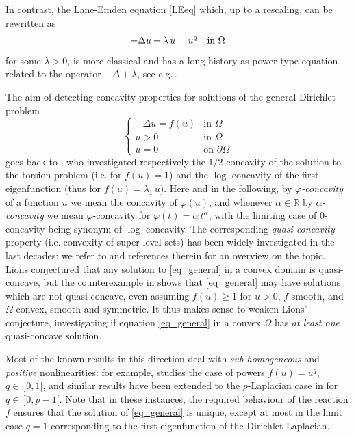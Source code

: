 \documentclass[12pt]{amsart}
\numberwithin{equation}{section}
\theoremstyle{plain}
\theoremstyle{plain}
\theoremstyle{plain}
\theoremstyle{definition}
\newcommand{\R}{{\mathbb R}}
\renewcommand{\ge}{\geqslant}
\begin{document}
In contrast, the Lane-Emden equation \eqref{LEeq} which, up to a rescaling, can be rewritten as
$$-\Delta u + \lambda\, u = u^q \quad \hbox{in $\Omega$}$$
for some $\lambda>0$, is more classical and has a long history as power type equation related to the operator $-\Delta + \lambda$, see e.g.$\,$\cite{Dan95, DGP99}. 

\medskip

The aim of detecting concavity properties for solutions of the general Dirichlet problem
\begin{equation}
\label{eq_general}
\begin{cases}
-\Delta u=f(u)& \text{in $\Omega$}\\
u>0&\text{in $\Omega$}\\
u=0&\text{on $\partial\Omega$}
\end{cases}
\end{equation}
goes back to \cite{Mak71, BrLi76}, who investigated respectively the $1/2$-concavity of the solution to the torsion problem (i.e.$\;$for $f(u)=1$) and the $\log$-concavity of the first eigenfunction (thus for $f(u)=\lambda_1\, u$). 
Here and in the following, by \emph{$\varphi$-concavity} of a function $u$ we mean the concavity of $\varphi(u)$, and whenever $\alpha\in \R$ by \emph{$\alpha$-concavity} we mean $\varphi$-concavity for $\varphi(t)=\alpha\, t^\alpha$, with the limiting case of $0$-concavity being synonym of $\log$-concavity. 
The corresponding {\em quasi-concavity} property (i.e.$\;$convexity of super-level sets) has been widely investigated in the last decades: we refer to \cite{GaSq25, AAGS24} and references therein for an overview on the topic. 
Lions \cite{Lio81} conjectured that any solution to \eqref{eq_general} in a convex domain is quasi-concave, but the counterexample in \cite{HNS16} shows that \eqref{eq_general} 
may have solutions which are not quasi-concave, even assuming $f(u)\ge 1$ for $u>0$, $f$ smooth, and $\Omega$ convex, smooth and symmetric. 
It thus makes sense to weaken Lions' conjecture, investigating if equation \eqref{eq_general} in a convex $\Omega$ has {\em at least one} quasi-concave solution.

Most of the known results in this direction deal with \emph{sub-homogeneous} and \emph{positive} nonlinearities: for example, \cite{Ken85} studies the case of powers $f(u)=u^q$, $q \in\ ]0,1[$, and similar results have been extended to the $p$-Laplacian case in \cite{Sak87} for $q \in\ ]0,p-1[$. 
Note that in these instances, the required behaviour of the reaction $f$ ensures that the solution of \eqref{eq_general} is unique, except at most in the limit case $q=1$ corresponding to the first eigenfunction of the Dirichlet Laplacian.
\end{document}
